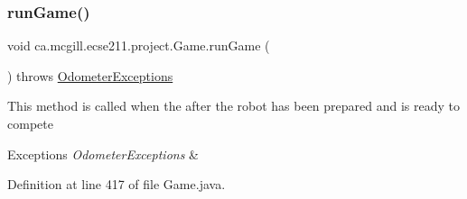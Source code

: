 \subsubsection{\texorpdfstring{run\+Game()}{runGame()}}
{\footnotesize\ttfamily void ca.\+mcgill.\+ecse211.\+project.\+Game.\+run\+Game (\begin{DoxyParamCaption}{ }\end{DoxyParamCaption}) throws \hyperlink{classca_1_1mcgill_1_1ecse211_1_1odometer_1_1_odometer_exceptions}{Odometer\+Exceptions}}

This method is called when the after the robot has been prepared and is ready to compete


\begin{DoxyExceptions}{Exceptions}
{\em Odometer\+Exceptions} & \\
\hline
\end{DoxyExceptions}


Definition at line 417 of file Game.\+java.


